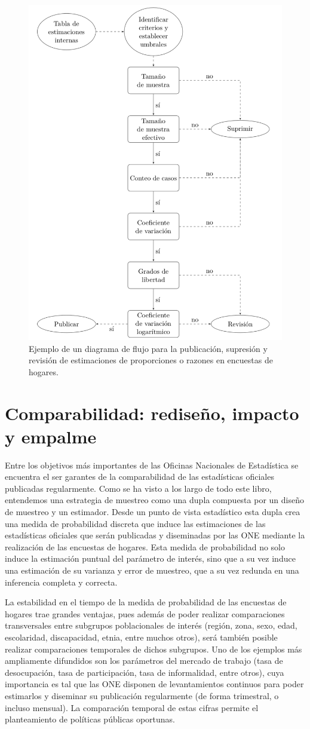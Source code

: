\documentclass[
  12pt,
]{book}
\begin{document}
\begin{figure}
\includegraphics[width=0.5\linewidth]{Pics/CSj1} \caption{Ejemplo de un diagrama de flujo para la publicación, supresión y revisión de estimaciones de proporciones o razones en encuestas de hogares.}\label{fig:figCSj1}
\end{figure}

\hypertarget{comparabilidad-rediseuxf1o-impacto-y-empalme}{%
\chapter{Comparabilidad: rediseño, impacto y empalme}\label{comparabilidad-rediseuxf1o-impacto-y-empalme}}

Entre los objetivos más importantes de las Oficinas Nacionales de Estadística se encuentra el ser garantes de la comparabilidad de las estadísticas oficiales publicadas regularmente. Como se ha visto a los largo de todo este libro, entendemos una estrategia de muestreo como una dupla compuesta por un diseño de muestreo y un estimador. Desde un punto de vista estadístico esta dupla crea una medida de probabilidad discreta que induce las estimaciones de las estadísticas oficiales que serán publicadas y diseminadas por las ONE mediante la realización de las encuestas de hogares. Esta medida de probabilidad no solo induce la estimación puntual del parámetro de interés, sino que a su vez induce una estimación de su varianza y error de muestreo, que a su vez redunda en una inferencia completa y correcta.

La estabilidad en el tiempo de la medida de probabilidad de las encuestas de hogares trae grandes ventajas, pues además de poder realizar comparaciones transversales entre subgrupos poblacionales de interés (región, zona, sexo, edad, escolaridad, discapacidad, etnia, entre muchos otros), será también posible realizar comparaciones temporales de dichos subgrupos. Uno de los ejemplos más ampliamente difundidos son los parámetros del mercado de trabajo (tasa de desocupación, tasa de participación, tasa de informalidad, entre otros), cuya importancia es tal que las ONE disponen de levantamientos continuos para poder estimarlos y diseminar su publicación regularmente (de forma trimestral, o incluso mensual). La comparación temporal de estas cifras permite el planteamiento de políticas públicas oportunas.
\end{document}
